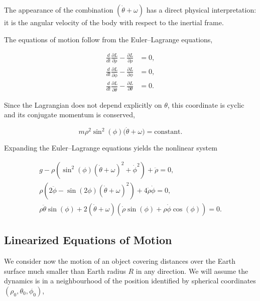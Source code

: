 \documentclass[12pt]{article}
\begin{document}
The appearance of the combination $(\dot\theta+\omega)$ has a direct physical interpretation:
it is the angular velocity of the body with respect to the inertial frame.

The equations of motion follow from the Euler--Lagrange equations,

\begin{align}
  \frac{d}{dt}\frac{\partial L}{\partial\dot\rho}
    -\frac{\partial L}{\partial\rho}
    &=0, \\
  \frac{d}{dt}\frac{\partial L}{\partial\dot\phi}
    -\frac{\partial L}{\partial\phi}
    &=0, \\
  \frac{d}{dt}\frac{\partial L}{\partial\dot\theta}
    -\frac{\partial L}{\partial\theta}
    &=0.
\end{align}

Since the Lagrangian does not depend explicitly on $\theta$, this coordinate is cyclic and
its conjugate momentum is conserved,

\[
m\rho^2\sin^2(\phi)\bigl(\dot\theta+\omega\bigr)
=
\text{constant}.
\]

Expanding the Euler--Lagrange equations yields the nonlinear system

\begin{equation}
  \begin{gathered}
    g
    -\rho
      \left(
        \sin^2(\phi)(\dot\theta+\omega)^2
        +
        \dot\phi^2
      \right)
    +
    \ddot\rho
    =0,
    \\[0.4em]
    \rho
    \left(
      2\ddot\phi
      -
      \sin(2\phi)(\dot\theta+\omega)^2
    \right)
    +
    4\dot\rho\dot\phi
    =0,
    \\[0.4em]
    \rho\ddot\theta\sin(\phi)
    +
    2(\dot\theta+\omega)
    \left(
      \dot\rho\sin(\phi)
      +
      \rho\dot\phi\cos(\phi)
    \right)
    =0.
  \end{gathered}
  \label{earth:spherical-equations-of-motion}
\end{equation}

\subsection{Linearized Equations of Motion}

We consider now the motion of an object covering distances over the Earth surface much
smaller than Earth radius $R$ in any direction. We will assume the dynamics is in a
neighbourhood of the position identified by spherical coordinates $(\rho_0, \theta_0, \phi_0)$,
\end{document}
